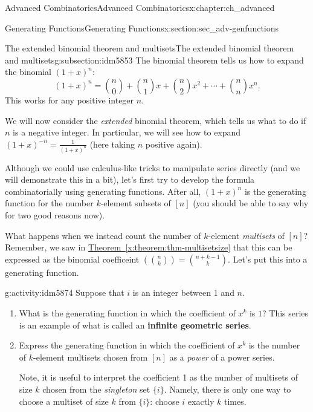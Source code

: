 \documentclass[oneside,10pt,]{book}
\newcommand{\terminology}[1]{\textbf{#1}}
\numberwithin{equation}{chapter}
\newcommand{\mchoose}[2]{\left(\!\binom{#1}{#2}\!\right)}
\begin{document}
\begin{chapterptx}{Advanced Combinatorics}{}{Advanced Combinatorics}{}{}{x:chapter:ch_advanced}
\begin{sectionptx}{Generating Functions}{}{Generating Functions}{}{}{x:section:sec_adv-genfunctions}
%
\begin{subsectionptx}{The extended binomial theorem and multisets}{}{The extended binomial theorem and multisets}{}{}{g:subsection:idm5853}
The binomial theorem tells us how to expand the binomial \((1+x)^n\):%
\begin{equation*}
(1+x)^n = \binom{n}{0} + \binom{n}{1}x + \binom{n}{2}x^2 + \cdots + \binom{n}{n}x^n\text{.}
\end{equation*}
This works for any positive integer \(n\).%
\par
We will now consider the \emph{extended} binomial theorem, which tells us what to do if \(n\) is a negative integer.  In particular, we will see how to expand \((1+x)^{-n} = \frac{1}{(1+x)^n}\) (here taking \(n\) positive again).%
\par
Although we could use calculus-like tricks to manipulate series directly (and we will demonstrate this in a bit), let's first try to develop the formula combinatorially using generating functions.  After all, \((1+x)^n\) is the generating function for the number \(k\)-element subsets of \([n]\) (you should be able to say why for two good reasons now).%
\par
What happens when we instead count the number of \(k\)-element \emph{multisets} of \([n]\)?  Remember, we saw in \hyperref[x:theorem:thm-multisetsize]{Theorem~\ref{x:theorem:thm-multisetsize}} that this can be expressed as the binomial coefficeint \(\mchoose{n}{k} = \binom{n+k-1}{k}\).  Let's put this into a generating function.%
\begin{activity}{}{g:activity:idm5874}%
Suppose that \(i\) is an integer between 1 and \(n\).%
\begin{enumerate}[font=\bfseries,label=(\alph*),ref=\alph*]
\item{}What is the generating function in which the coefficient of \(x^k\) is \(1\)? This series is an example of what is called an \terminology{infinite geometric series}.%
\item{}Express the generating function in which the coefficient of \(x^k\) is the number of \(k\)-element multisets chosen from \([n]\) as a \emph{power} of a power series.%
\par
Note, it is useful to interpret the coefficient 1 as the number of multisets of size \(k\) chosen from the \emph{singleton} set \(\{i\}\). Namely, there is only one way to choose a multiset of size \(k\) from \(\{i\}\): choose \(i\) exactly \(k\) times.%
\par

\end{enumerate}
\end{activity}
\end{subsectionptx}
\end{sectionptx}
\end{chapterptx}
\end{document}
